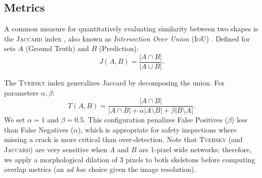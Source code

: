\documentclass[conference]{IEEEtran}
\newcommand{\module}[1]{\left| #1 \right|}
\begin{document}


\subsection{Metrics}\label{sec:metrics}
A common measure for quantitatively evaluating similarity between two shapes is the \textsc{Jaccard} index \cite{Jaccard1901}, also known as \textit{Intersection Over Union} (\textsc{IoU}) \cite{IoUDeepLearning}. Defined for sets $A$ (Ground Truth) and $B$ (Prediction):
\begin{equation}
J(A,B) = \frac{\module{A \cap B}}{\module{A \cup B}}.
\end{equation}

The \textsc{Tversky} index \cite{Tversky1977} generalizes Jaccard by decomposing the union. For parameters $\alpha, \beta$:
\begin{equation}
T(A, B) = \frac{\module{A \cap B}}{\module{A \cap B} + \alpha \module{A \setminus B} + \beta \module{B \setminus A}}.
\end{equation}
We set $\alpha = 1$ and $\beta = 0.5$. This configuration penalizes False Positives ($\beta$) less than False Negatives ($\alpha$), which is appropriate for safety inspections where missing a crack is more critical than over-detection.
Note that \textsc{Tversky} (and \textsc{Jaccard}) are very sensitive when $A$ and $B$ are 1-pixel wide networks; therefore, we apply a morphological dilation of 3 pixels to both skeletons before computing overlap metrics (an \textit{ad hoc} choice given the image resolution).
\end{document}
